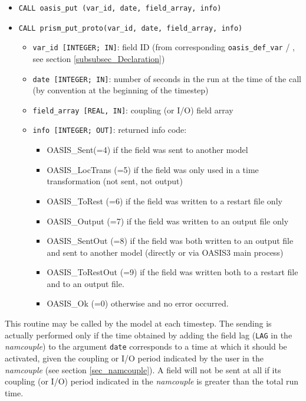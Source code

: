 \begin{itemize} 
\item {\tt CALL oasis\_put       (var\_id, date, field\_array, info)}
\item {\tt CALL prism\_put\_proto(var\_id, date, field\_array, info)}
\begin{itemize}
\item {\tt var\_id [INTEGER; IN]}: field ID (from
  corresponding {\tt oasis\_def\_var} / ,
  see section \ref{subsubsec_Declaration})
\item {\tt date [INTEGER; IN]}: number of seconds in the run at the
time of the call (by convention at the beginning of the timestep)
\item {\tt field\_array [REAL, IN]}: coupling (or I/O) field array 
\item {\tt info [INTEGER; OUT]}: returned info code:
   \begin{itemize} 
      \item OASIS\_Sent(=4) if the field was sent to another model 
      \item OASIS\_LocTrans (=5) if the field was only used in a time
       transformation (not sent, not output)
      \item OASIS\_ToRest (=6) if the field was written to a restart file only
      \item OASIS\_Output (=7) if the field was written to an output file only
      \item OASIS\_SentOut (=8) if the field was both written to an output file
       and sent to another model (directly or via OASIS3 main process)
      \item OASIS\_ToRestOut (=9) if the field was written both to a
       restart file and to an output file.
      \item OASIS\_Ok (=0) otherwise and no error occurred.
   \end{itemize}
\end{itemize}
\end{itemize}

This routine may be called by the model at each timestep. The sending
is actually performed only if the time obtained by adding the field
lag ({\tt LAG} in the {\em namcouple}) to the argument {\tt date}
corresponds to a time at which it should be activated, given the
coupling or I/O period indicated by the user in the {\it namcouple} (see
section \ref{sec_namcouple}). A field will not be sent at all if its
coupling (or I/O) period indicated in the {\it namcouple} is greater
than the total run time. 

